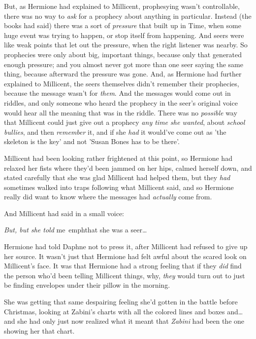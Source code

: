 But, as Hermione had explained to Millicent, prophesying wasn't controllable, 
there was no way to \emph{ask} for a prophecy about anything in particular. 
Instead (the books had said) there was a sort of \emph{pressure} that built up 
in Time, when some huge event was trying to happen, or stop itself from 
happening. And seers were like weak points that let out the pressure, when the 
right listener was nearby. So prophecies were only about big, important things, 
because only that generated enough pressure; and you almost never got more than 
one seer saying the same thing, because afterward the pressure was gone. And, 
as Hermione had further explained to Millicent, the seers themselves didn't 
remember their prophecies, because the message wasn't for \emph{them}. And the 
messages would come out in riddles, and only someone who heard the prophecy in 
the seer's original voice would hear all the meaning that was in the riddle. 
There was no \emph{possible} way that Millicent could just give out a prophecy 
\emph{any time she wanted}, about \emph{school bullies}, and then 
\emph{remember} it, and if she \emph{had} it would've come out as 'the skeleton 
is the key' and not 'Susan Bones has to be there'.

Millicent had been looking rather frightened at this point, so Hermione had 
relaxed her fists where they'd been jammed on her hips, calmed herself down, 
and stated carefully that she was glad Millicent had helped them, but they 
\emph{had} sometimes walked into traps following what Millicent said, and so 
Hermione really did want to know where the messages had \emph{actually} come 
from.

And Millicent had said in a small voice:

\emph{But, but she told} me\ emph{that she was a seer{\ldots}}

Hermione had told Daphne not to press it, after Millicent had refused to give 
up her source. It wasn't just that Hermione had felt awful about the scared 
look on Millicent's face. It was that Hermione had a strong feeling that if 
they \emph{did} find the person who'd been telling Millicent things, why, 
\emph{they} would turn out to just be finding envelopes under their pillow in 
the morning.

She was getting that same despairing feeling she'd gotten in the battle before 
Christmas, looking at Zabini's charts with all the colored lines and boxes 
and{\ldots} and she had only just now realized what it meant that \emph{Zabini} 
had been the one showing her that chart.

